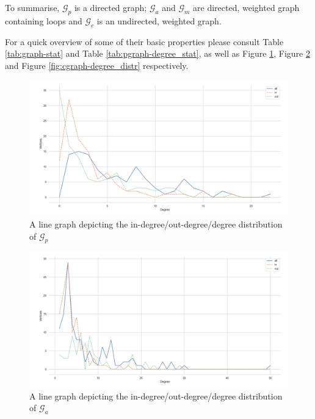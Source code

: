 \documentclass[11pt,a4paper]{book}
\theoremstyle{definition}
\theoremstyle{definition}
\theoremstyle{definition}
\theoremstyle{remark}
\newcommand{\pgraph}{\mathcal{G}_{p}}
\newcommand{\agraph}{\mathcal{G}_{a}}
\newcommand{\cgraph}{\mathcal{G}_{c}}
\newcommand{\acgraph}{\mathcal{G}_{m}}
\begin{document}
To summarise, $\pgraph$ is a directed graph; $\agraph$ and $\acgraph$ are directed, weighted graph containing loops and $\cgraph$ is an undirected, weighted graph. 



For a quick overview of some of their basic properties please consult Table \ref{tab:graph-stat} and Table  \ref{tab:pgraph-degree_stat}, as well as Figure \ref{fig:pgraph-degree_distr},  Figure \ref{fig:agraph-degree_distr} and  Figure \ref{fig:cgraph-degree_distr} respectively.


\begin{figure}[h]
\includegraphics[width=\textwidth]{degree_distribution.png}
\caption{A line graph depicting the in-degree/out-degree/degree distribution of $\pgraph$}
\label{fig:pgraph-degree_distr}
\end{figure}


\begin{figure}[h]
\includegraphics[width=\textwidth]{agraph_degree_distribution.png}
\caption{A line graph depicting the in-degree/out-degree/degree distribution of $\agraph$}
\label{fig:agraph-degree_distr}
\end{figure}
\end{document}
